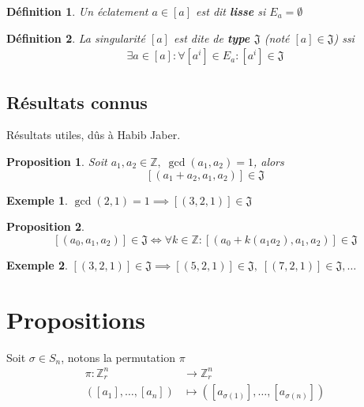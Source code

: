 \documentclass{article}
\newtheorem{definition}{Définition}
\newtheorem{proposition}{Proposition}
\newtheorem{exemple}{Exemple}
\begin{document}
\begin{definition}
    Un éclatement $a \in [a]$ est dit \textbf{lisse} si $E_a = \emptyset$
\end{definition}

\begin{definition}
    La singularité $[a]$ est dite de \textbf{type $\mathfrak{J}$} (noté $[a] \in \mathfrak{J}$) ssi
    \begin{align*}
        \exists a \in [a] : \forall [a^i] \in E_a : [a^i] \in \mathfrak{J}
    \end{align*}
\end{definition}
    
\subsection{Résultats connus}
Résultats utiles, dûs à Habib Jaber.

\begin{proposition}
    Soit $a_1, a_2 \in \mathbb{Z},\; \gcd(a_1, a_2) = 1$, alors
    \[ [(a_1 + a_2, a_1, a_2)] \in \mathfrak{J} \]
\end{proposition}

\begin{exemple}
    $\gcd(2, 1) = 1 \implies [(3, 2, 1)] \in \mathfrak{J}$
\end{exemple}

\begin{proposition}
    \[ 
    [(a_0, a_1, a_2)] \in \mathfrak{J} \iff 
    \forall k \in \mathbb{Z}: [(a_0 + k(a_1a_2), a_1, a_2)] \in \mathfrak{J} 
    \]
\end{proposition}

\begin{exemple}
    $[(3, 2, 1)] \in \mathfrak{J} \implies [(5, 2, 1)] \in \mathfrak{J},\; [(7, 2, 1)] \in \mathfrak{J}, \dots$
\end{exemple}

\newpage

\section{Propositions}

Soit $\sigma \in S_n$, notons la permutation $\pi$
\begin{align*}
    \pi : \mathbb{Z}^n_r & \to \mathbb{Z}^n_r \\
    ([a_1], \dots, [a_n]) & \mapsto ([a_{\sigma(1)}], \dots, [a_{\sigma(n)}])
\end{align*}
\end{document}
